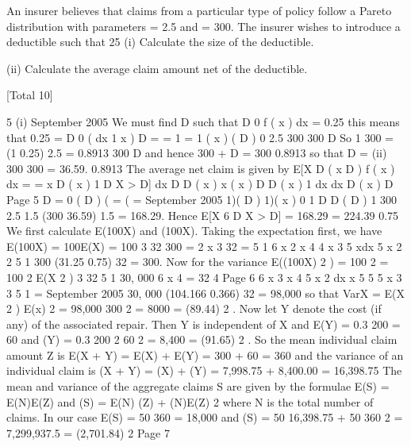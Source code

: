 \documentclass[a4paper,12pt]{article}
\begin{document}
 


An insurer believes that claims from a particular type of policy follow a Pareto
distribution with parameters = 2.5 and = 300. The insurer wishes to introduce a
deductible such that 25%
(i) Calculate the size of the deductible.

(ii) Calculate the average claim amount net of the deductible.

[Total 10]

5
(i)
September 2005
We must find D such that
D
0
f ( x ) dx = 0.25
this means that
0.25 =
D
0
(
dx
1
x )
D
=
= 1
= 1
( x )
( D )
0
2.5
300
300 D
So
1
300
= (1 0.25) 2.5 = 0.8913
300 D
and hence
300 + D =
300
0.8913
so that
D =
(ii)
300
300 = 36.59.
0.8913
The average net claim is given by E[X
D
( x D ) f ( x ) dx =
=
x
D
(
x )
1
D X > D]
dx D
D
(
x )
x
(
x )
D
D
(
x )
1
dx
dx D
(
x )
D
Page 5%
D
= 0
(
D )
(
=
(
=
September 2005
1)(
D )
1)(
x )
0
1
D
D
(
D )
1
300 2.5
1.5 (300 36.59) 1.5
= 168.29.
Hence E[X
6
D X > D] =
168.29
= 224.39
0.75
We first calculate E(100X) and (100X). Taking the expectation first, we have
E(100X) = 100E(X)
= 100
3
32
300
=
2 x 3
32
=
5
1
6 x 2
x 4
4
x 3 5 xdx
5 x 2
2
5
1
300
(31.25 0.75)
32
= 300.
Now for the variance
E((100X) 2 ) = 100 2
= 100 2
E(X 2 )
3
32
5
1
30, 000 6 x 4
=
32
4
Page 6
6 x 3 x 4 5 x 2 dx
x 5
5
5 x 3
3
5
1%
=
September 2005
30, 000
(104.166 0.366)
32
= 98,000
so that
VarX = E(X 2 )
E(x) 2
= 98,000
300 2
= 8000
= (89.44) 2 .
Now let Y denote the cost (if any) of the associated repair. Then Y is independent of X
and
E(Y) = 0.3
200 = 60
and
(Y) = 0.3
200 2
60 2 = 8,400 = (91.65) 2 .
So the mean individual claim amount Z is
E(X + Y) = E(X) + E(Y) = 300 + 60 = 360
and the variance of an individual claim is
(X + Y) = (X) + (Y) = 7,998.75 + 8,400.00 = 16,398.75
The mean and variance of the aggregate claims S are given by the formulae
E(S) = E(N)E(Z)
and
(S) = E(N) (Z) + (N)E(Z) 2
where N is the total number of claims. In our case
E(S) = 50
360 = 18,000
and
(S) = 50
16,398.75 + 50
360 2 = 7,299,937.5 = (2,701.84) 2
Page 7%
\end{document}
